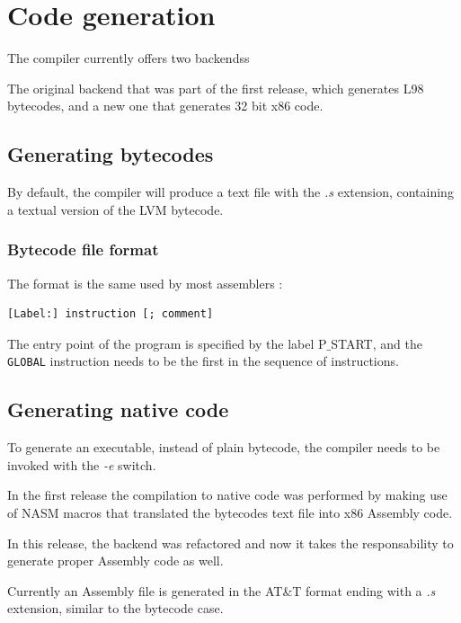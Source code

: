 \documentclass[a4paper, 11pt]{report}
\newcommand{\keyword}[1]{\texttt{#1}}
\begin{document}
\chapter{Code generation}

The compiler currently offers two backendss

The original backend that was part of the first release, which generates L98 bytecodes,
and a new one that generates 32 bit x86 code.


\section{Generating bytecodes}

By default, the compiler will produce a text file with the \emph{.s} extension,
containing a textual version of the LVM bytecode.


\subsection{Bytecode file format}

  The format is the same used by most assemblers :

\begin{verbatim}
[Label:] instruction [; comment]
\end{verbatim}

  The entry point of the program is specified by the label P$\_$START, and the \keyword{GLOBAL}
instruction needs to be the first in the sequence of instructions.

\section{Generating native code}

To generate an executable, instead of plain bytecode, the compiler needs to be
invoked with the \emph{-e} switch.

In the first release the compilation to native code was performed by making use
of NASM macros that translated the bytecodes text file into x86 Assembly code.

In this release, the backend was refactored and now it takes the responsability
to generate proper Assembly code as well.

Currently an Assembly file is generated in the AT\&T format ending with a \emph{.s}
extension, similar to the bytecode case.
\end{document}
